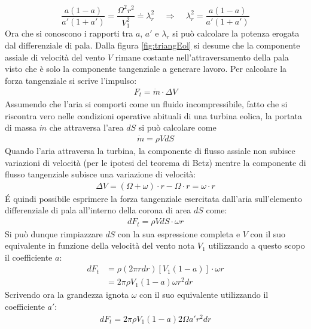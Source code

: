 \begin{equation}\label{eq:lambdara}
\frac{a \left( 1 - a \right)}{a' \left(1 + a' \right)} = \frac{\Omega^2 r^2}{V_1^2}\doteq \lambda_r^2 \;\;\;\; \Rightarrow \;\;\;\; \lambda_r^2 = \frac{a \left(1 - a \right)}{a' \left( 1 + a' \right)}
\end{equation}
Ora che si conoscono i rapporti tra $a$, $a'$ e $\lambda_r$ si può calcolare la potenza erogata dal differenziale di pala. Dalla figura \ref{fig:triangEol} si desume che la componente assiale di velocità del vento $V$ rimane costante nell'attraversamento della pala visto che è solo la componente tangenziale a generare lavoro. Per calcolare la forza tangenziale si scrive l'impulso:
\begin{align*}
F_t = \dot{m} \cdot \Delta V
\end{align*}
Assumendo che l'aria si comporti come un fluido incompressibile, fatto che si riscontra vero nelle condizioni operative abituali di una turbina eolica, la portata di massa $\dot{m}$ che attraversa l'area $dS$ si può calcolare come 
\begin{align*}
\dot{m} = \rho V dS
\end{align*}
Quando l'aria attraversa la turbina, la componente di flusso assiale non subisce variazioni di velocità (per le ipotesi del teorema di Betz) mentre la componente di flusso tangenziale subisce una variazione di velocità:
\begin{align*}
\Delta V = \left( \Omega + \omega \right) \cdot r - \Omega \cdot r = \omega \cdot r
\end{align*}
\'E quindi possibile esprimere la forza tangenziale esercitata dall'aria sull'elemento differenziale di pala all'interno della corona di area $dS$ come:
\begin{align*}
dF_t = \rho V dS \cdot \omega r
\end{align*}
Si può dunque rimpiazzare $dS$ con la sua espressione completa e $V$ con il suo equivalente in funzione della velocità del vento nota $V_1$ utilizzando a questo scopo il coefficiente $a$:
\begin{align*}
dF_t &= \rho \left( 2 \pi r dr \right) \left[ V_1 \left(1 -a \right) \right] \cdot \omega r\\
& = 2 \pi \rho V_1 \left( 1-a \right) \omega r^2 dr
\end{align*}
Scrivendo ora la grandezza ignota $\omega$ con il suo equivalente utilizzando il coefficiente $a'$:
\begin{align*}
dF_t = 2 \pi \rho V_1 \left( 1- a \right) 2 \Omega a' r^2 dr
\end{align*}
